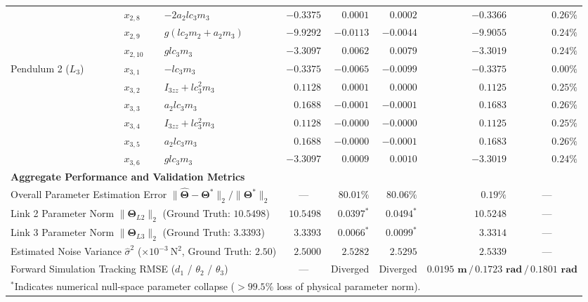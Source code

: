 \documentclass[lettersize,journal]{IEEEtran}
\begin{document}
\begin{table}[t]
{\begin{tabular}{l l l r r r r r}
 & $x_{2,8}$ & $-2 a_2 lc_3 m_3$ & $-0.3375$ & $0.0001$ & $0.0002$ & $-0.3366$ & $0.26\%$ \\
 & $x_{2,9}$ & $g(lc_2 m_2 + a_2 m_3)$ & $-9.9292$ & $-0.0113$ & $-0.0044$ & $-9.9055$ & $0.24\%$ \\
 & $x_{2,10}$ & $g lc_3 m_3$ & $-3.3097$ & $0.0062$ & $0.0079$ & $-3.3019$ & $0.24\%$ \\
\midrule
Pendulum 2 ($L_3$) & $x_{3,1}$ & $-lc_3 m_3$ & $-0.3375$ & $-0.0065$ & $-0.0099$ & $-0.3375$ & $0.00\%$ \\
 & $x_{3,2}$ & $I_{3zz}+lc_3^2 m_3$ & $0.1128$ & $0.0001$ & $0.0000$ & $0.1125$ & $0.25\%$ \\
 & $x_{3,3}$ & $a_2 lc_3 m_3$ & $0.1688$ & $-0.0001$ & $-0.0001$ & $0.1683$ & $0.26\%$ \\
 & $x_{3,4}$ & $I_{3zz}+lc_3^2 m_3$ & $0.1128$ & $-0.0000$ & $-0.0000$ & $0.1125$ & $0.25\%$ \\
 & $x_{3,5}$ & $a_2 lc_3 m_3$ & $0.1688$ & $-0.0000$ & $-0.0001$ & $0.1683$ & $0.26\%$ \\
 & $x_{3,6}$ & $g lc_3 m_3$ & $-3.3097$ & $0.0009$ & $0.0010$ & $-3.3019$ & $0.24\%$ \\
\midrule
\multicolumn{8}{l}{\textbf{Aggregate Performance and Validation Metrics}} \\
\midrule
\multicolumn{3}{l}{Overall Parameter Estimation Error $\|\hat{\bm{\Theta}} - \bm{\Theta}^*\|_2 / \|\bm{\Theta}^*\|_2$} & \multicolumn{1}{c}{---} & $80.01\%$ & $80.06\%$ & $\mathbf{0.19\%}$ & \multicolumn{1}{c}{---} \\
\multicolumn{3}{l}{Link 2 Parameter Norm $\|\bm{\Theta}_{L2}\|_2$ (Ground Truth: $10.5498$)} & $10.5498$ & $0.0397^*$ & $0.0494^*$ & $\mathbf{10.5248}$ & \multicolumn{1}{c}{---} \\
\multicolumn{3}{l}{Link 3 Parameter Norm $\|\bm{\Theta}_{L3}\|_2$ (Ground Truth: $3.3393$)} & $3.3393$ & $0.0066^*$ & $0.0099^*$ & $\mathbf{3.3314}$ & \multicolumn{1}{c}{---} \\
\multicolumn{3}{l}{Estimated Noise Variance $\hat{\sigma}^2$ ($\times 10^{-3}~\mathrm{N^2}$, Ground Truth: $2.50$)} & $2.5000$ & $2.5282$ & $2.5295$ & $\mathbf{2.5339}$ & \multicolumn{1}{c}{---} \\
\multicolumn{3}{l}{Forward Simulation Tracking RMSE ($d_1$ / $\theta_2$ / $\theta_3$)} & \multicolumn{1}{c}{---} & \multicolumn{1}{c}{Diverged} & \multicolumn{1}{c}{Diverged} & \multicolumn{2}{c}{$\mathbf{0.0195\text{ m} \,/\, 0.1723\text{ rad} \,/\, 0.1801\text{ rad}}$} \\
\bottomrule
\multicolumn{8}{l}{\footnotesize $^*$Indicates numerical null-space parameter collapse ($>99.5\%$ loss of physical parameter norm).}
\end{tabular}%
}
\end{table}
\end{document}
